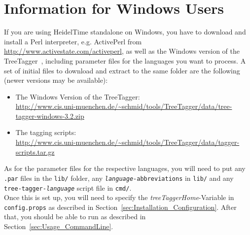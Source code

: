 \appendix
\section{Information for Windows Users}\label{app:windows}
If you are using HeidelTime standalone on Windows, you have to download and install a Perl interpreter, e.g. ActivePerl from \url{http://www.activestate.com/activeperl}, as well as the Windows version of the TreeTagger~\cite{TreeTagger}, including parameter files for the languages you want to process. A set of initial files to download and extract to the same folder are the following (newer versions may be available):
\begin{itemize}
  \item The Windows Version of the TreeTagger: \\
    \url{http://www.cis.uni-muenchen.de/~schmid/tools/TreeTagger/data/tree-tagger-windows-3.2.zip}
  \item The tagging scripts: \\
    \url{http://www.cis.uni-muenchen.de/~schmid/tools/TreeTagger/data/tagger-scripts.tar.gz}
\end{itemize}

As for the parameter files for the respective languages, you will need to put any \texttt{.par} files in the \texttt{lib/} folder, any \texttt{\textit{language}-abbreviations} in \texttt{lib/} and any \texttt{tree-tagger-\textit{language}} script file in \texttt{cmd/}. \\

Once this is set up, you will need to specify the \textit{treeTaggerHome}-Variable in \texttt{config.props} as described in Section~\ref{sec:Installation_Configuration}. After that, you should be able to run \product as described in Section~\ref{sec:Usage_CommandLine}.